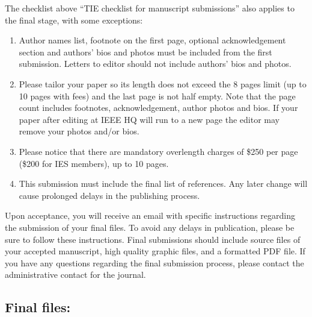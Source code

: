 \documentclass[journal]{IEEEtranTIE}
\begin{document}
The checklist above ``TIE checklist for manuscript submissions'' also applies to the final stage, with some exceptions:

\begin{enumerate}[1)]
	\item Author names list, footnote on the first page, optional acknowledgement section and authors' bios and photos must be included from the first submission. Letters to editor should not include authors' bios and photos.
	\item Please tailor your paper so its length does not exceed the 8 pages limit (up to 10 pages with fees) and the last page is not half empty. Note that the page count includes footnotes, acknowledgement, author photos and bios. If your paper after editing at IEEE HQ will run to a new page the editor may remove your photos and/or bios.
	\item Please notice that there are mandatory overlength charges of \$250 per page (\$200 for IES members), up to 10 pages.
	\item This submission must include the final list of references. Any later change will cause prolonged delays in the publishing process.
\end{enumerate}
	
Upon acceptance, you will receive an email with specific instructions regarding the submission of your final files.  To avoid any delays in publication, please be sure to follow these instructions. Final submissions should include source files of your accepted manuscript, high quality graphic files, and a formatted PDF file. If you have any questions regarding the final submission process, please contact the administrative contact for the journal.

\subsection{Final files:}
\end{document}
